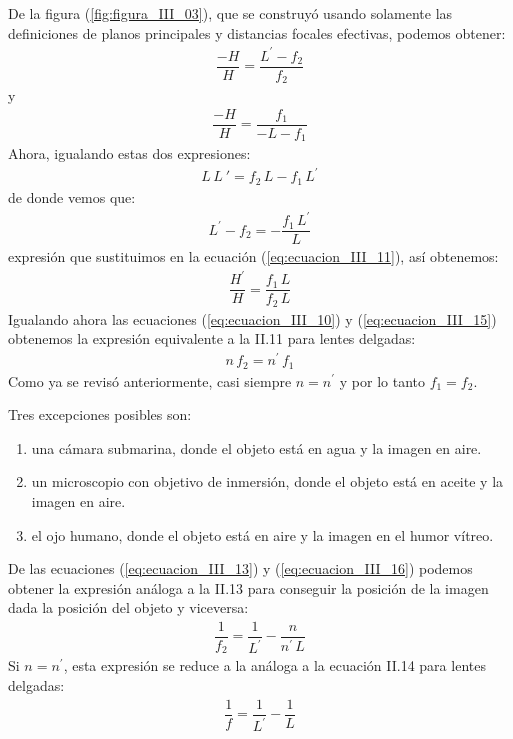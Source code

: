 \documentclass[14pt]{extarticle}
\begin{document}
De la figura (\ref{fig:figura_III_03}), que se construyó usando solamente las definiciones de planos principales y distancias focales efectivas, podemos obtener:
\begin{align}
\dfrac{- H}{H} = \dfrac{L^{\prime} - f_{2}}{f_{2}}
\label{eq:ecuacion_III_11}
\end{align}
y
\begin{align}
\dfrac{- H}{H} = \dfrac{f_{1}}{-L - f_{1}}
\label{eq:ecuacion_III_12}
\end{align}
Ahora, igualando estas dos expresiones:
\begin{align}
L \, L\ {\prime} = f_{2} \, L - f_{1} \, L^{\prime}
\label{eq:ecuacion_III_13}
\end{align}
de donde vemos que:
\begin{align}
L^{\prime} - f_{2} = - \dfrac{f_{1} \, L^{\prime}}{L}
\label{eq:ecuacion_III_14}
\end{align}
expresión que sustituimos en la ecuación (\ref{eq:ecuacion_III_11}), así obtenemos:
\begin{align}
\dfrac{H^{\prime}}{H} = \dfrac{f_{1} \, L}{f_{2} \, L}
\label{eq:ecuacion_III_15}
\end{align}
Igualando ahora las ecuaciones (\ref{eq:ecuacion_III_10}) y (\ref{eq:ecuacion_III_15}) obtenemos la expresión equivalente a la II.11 para lentes delgadas:
\begin{align}
n \, f_{2} = n^{\prime} \, f_{1}
\label{eq:ecuacion_III_16}
\end{align}
Como ya se revisó anteriormente, casi siempre $n = n^{\prime}$ y por lo tanto $f_{1} = f_{2}$.

Tres excepciones posibles son:

\begin{enumerate}[label=\roman*)]
\item una cámara submarina, donde el objeto está en agua y la imagen en aire.
\item un microscopio con objetivo de inmersión, donde el objeto está en aceite y la
imagen en aire.
\item el ojo humano, donde el objeto está en aire y la imagen en el humor vítreo.
\end{enumerate}
De las ecuaciones (\ref{eq:ecuacion_III_13}) y (\ref{eq:ecuacion_III_16}) podemos obtener la expresión análoga a la II.13 para conseguir la posición de la imagen dada la posición del objeto y viceversa:
\begin{align}
\dfrac{1}{f_{2}} = \dfrac{1}{L^{\prime}} - \dfrac{n}{n^{\prime} \, L}
\label{eq:ecuacion_III_17}
\end{align}
Si $n = n^{\prime}$, esta expresión se reduce a la análoga a la ecuación II.14 para lentes delgadas:
\begin{align}
\dfrac{1}{f} = \dfrac{1}{L^{\prime}} - \dfrac{1}{L}
\label{eq:ecuacion_III_18}
\end{align}
\end{document}
